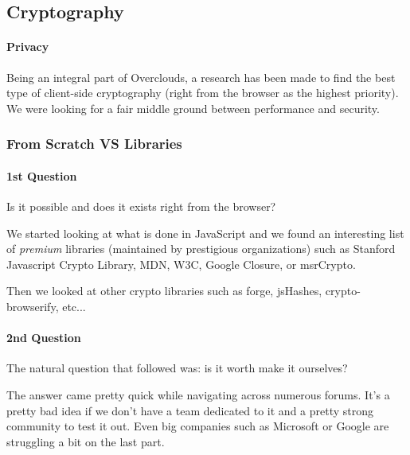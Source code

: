 
\subsection{Cryptography}
\paragraph{Privacy} Being an integral part of Overclouds, a research has been made to find the best type of client-side cryptography (right from the browser as the highest priority). We were looking for a fair middle ground between performance and security.

\subsubsection{From Scratch VS Libraries}
\paragraph{1st Question} Is it possible and does it exists right from the browser?

We started looking at what is done in JavaScript and we found an interesting list of \textit{premium} libraries (maintained by prestigious organizations) such as Stanford Javascript Crypto Library\cite{Stark2012SymmetricJavascript}, MDN\cite{MDN2015MDNCrypto}, W3C\cite{Sleevi2014WebAPI}, Google Closure\cite{Google2015ClosureLibrary}, or msrCrypto\cite{Microsoft2015MSRLibrary}.

Then we looked at other crypto libraries such as forge\cite{DigitalBazaar2016Forge}, jsHashes\cite{Johnston2015JsHashes}, crypto-browserify\cite{Tarr2013Crypto-Browserify}, etc...

\paragraph{2nd Question} The natural question that followed was: is it worth make it ourselves?

The answer came pretty quick while navigating across numerous forums. It's a pretty bad idea if we don't have a team dedicated to it and a pretty strong community to test it out. Even big companies such as Microsoft or Google are struggling a bit on the last part.

